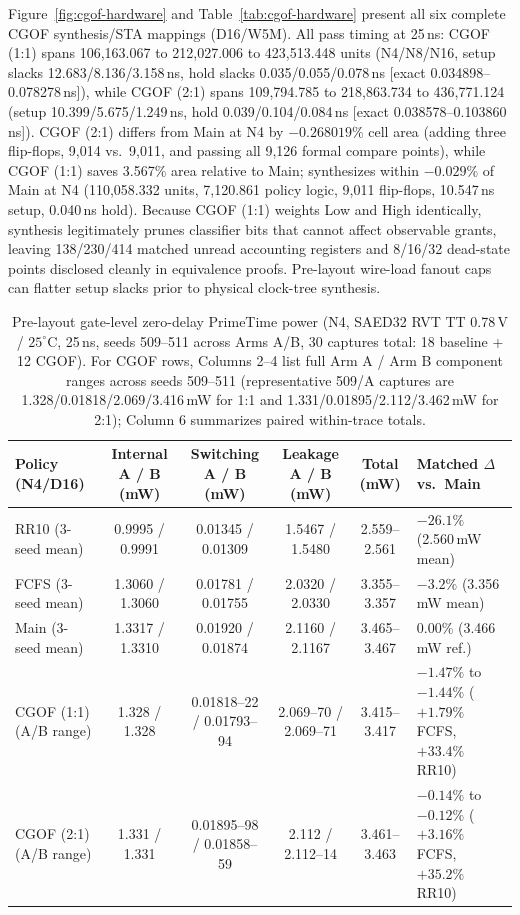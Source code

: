 Figure~\ref{fig:cgof-hardware} and Table~\ref{tab:cgof-hardware} present all six complete CGOF synthesis/STA mappings (D16/W5M). All pass timing at 25\,ns: CGOF (1:1) spans 106,163.067 to 212,027.006 to 423,513.448 units (N4\slash N8\slash N16, setup slacks 12.683\slash 8.136\slash 3.158\,ns, hold slacks 0.035\slash 0.055\slash 0.078\,ns [exact 0.034898--0.078278\,ns]), while CGOF (2:1) spans 109,794.785 to 218,863.734 to 436,771.124 (setup 10.399\slash 5.675\slash 1.249\,ns, hold 0.039\slash 0.104\slash 0.084\,ns [exact 0.038578--0.103860\,ns]). CGOF (2:1) differs from Main at N4 by $-0.268019\%$ cell area (adding three flip-flops, 9,014 vs.\ 9,011, and passing all 9,126 formal compare points), while CGOF (1:1) saves 3.567\% area relative to Main; \Alg{} synthesizes within $-0.029\%$ of Main at N4 (110,058.332 units, 7,120.861 policy logic, 9,011 flip-flops, 10.547\,ns setup, 0.040\,ns hold). Because CGOF (1:1) weights Low and High identically, synthesis legitimately prunes classifier bits that cannot affect observable grants, leaving 138\slash 230\slash 414 matched unread accounting registers and 8\slash 16\slash 32 dead-state points disclosed cleanly in equivalence proofs. Pre-layout wire-load fanout caps can flatter setup slacks prior to physical clock-tree synthesis.

\begin{table}[t]
\centering\footnotesize
\setlength{\tabcolsep}{2.5pt}
\begin{tabular}{@{}lccccP{.25\textwidth}@{}}
\toprule
Policy (N4/D16) & Internal A / B (mW) & Switching A / B (mW) & Leakage A / B (mW) & Total (mW) & Matched $\Delta$ vs.\ Main \\
\midrule
RR10 (3-seed mean) & 0.9995 / 0.9991 & 0.01345 / 0.01309 & 1.5467 / 1.5480 & 2.559--2.561 & $-26.1\%$ (2.560\,mW mean) \\
FCFS (3-seed mean) & 1.3060 / 1.3060 & 0.01781 / 0.01755 & 2.0320 / 2.0330 & 3.355--3.357 & $-3.2\%$ (3.356\,mW mean) \\
Main (3-seed mean) & 1.3317 / 1.3310 & 0.01920 / 0.01874 & 2.1160 / 2.1167 & 3.465--3.467 & 0.00\% (3.466\,mW ref.) \\
CGOF (1:1) (A/B range) & 1.328 / 1.328 & 0.01818--22 / 0.01793--94 & 2.069--70 / 2.069--71 & 3.415--3.417 & $-1.47\%$ to $-1.44\%$ ($+1.79\%$ FCFS, $+33.4\%$ RR10) \\
CGOF (2:1) (A/B range) & 1.331 / 1.331 & 0.01895--98 / 0.01858--59 & 2.112 / 2.112--14 & 3.461--3.463 & $-0.14\%$ to $-0.12\%$ ($+3.16\%$ FCFS, $+35.2\%$ RR10) \\
\bottomrule
\end{tabular}
\caption{Pre-layout gate-level zero-delay PrimeTime power (N4, SAED32 RVT TT 0.78\,V / $25^{\circ}$C, 25\,ns, seeds 509--511 across Arms A/B, 30 captures total: 18 baseline + 12 CGOF). For CGOF rows, Columns 2--4 list full Arm A / Arm B component ranges across seeds 509--511 (representative 509/A captures are 1.328/0.01818/2.069/3.416\,mW for 1:1 and 1.331/0.01895/2.112/3.462\,mW for 2:1); Column 6 summarizes paired within-trace totals.}
\label{tab:power-summary}
\end{table}

